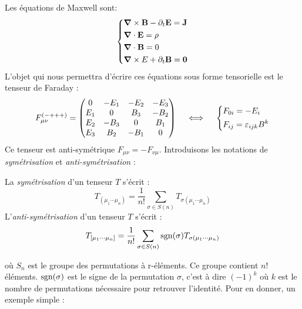 Les équations de Maxwell sont:
\begin{align}
    \begin{dcases}
        \bm{\mathrm{\nabla}} \times \bm{\mathrm{B}} -\partial_{t} \bm{\mathrm{E}} = \bm{\mathrm{J}}  \\
        \bm{\mathrm{\nabla}} \cdot \bm{\mathrm{E}} = \rho\\
        \bm{\mathrm{\nabla}} \cdot \bm{\mathrm{B}} = 0\\
        \bm{\mathrm{\nabla}} \times E + \partial_t \bm{\mathrm{B}} = \bm{\mathrm{0}}
    \end{dcases}
\end{align}
L'objet qui nous permettra d'écrire ces équations sous forme tensorielle est le tenseur de Faraday :
\begin{align}
    \label{eq: Faraday}
    F_{\mu \nu}^{(-+++)} =  \begin{pmatrix}
    0 & -E_1 & -E_2 & -E_3\\
    E_1 & 0 & B_3 & -B_2\\
    E_2 & -B_3 & 0 & B_1\\
    E_3 & B_2 & -B_1 & 0
    \end{pmatrix} \quad \iff \quad \begin{dcases}
        F_{0i} = -E_i\\
        F_{ij} =  \varepsilon_{ijk}B^k
    \end{dcases}
\end{align}
Ce tenseur est anti-symétrique $F_{\mu \nu} = - F_{\nu \mu}$. Introduisons les notations de \emph{symétrisation} et \emph{anti-symétrisation} :
\begin{theoremframe}
    \begin{defi}
        La \emph{symétrisation} d'un tenseur $T$ s'écrit :
        \begin{equation}
            T_{(\mu_{1} \cdots \mu_{n})} =\frac{1}{n!}\sum_{\sigma \in S(n)} T_{\sigma (\mu_{1} \cdots \mu_{n})}
        \end{equation}
        L'\emph{anti-symétrisation} d'un tenseur $T$ s'écrit :
        \begin{equation}
            T_{[\mu_{1} \cdots \mu_{n}]} =\frac{1}{n!}\sum_{\sigma \in S(n)} \operatorname{sgn} (\sigma) T_{\sigma (\mu_{1} \cdots \mu_{n})}
        \end{equation}
    \end{defi}
\end{theoremframe}
où $S_n$ est le groupe des permutations à r-éléments. Ce groupe contient $n!$ éléments. $\operatorname{sgn}(\sigma)$ est le signe de la permutation $\sigma$, c'est à dire $(-1)^k$ où $k$ est le nombre de permutations nécessaire pour retrouver l'identité. Pour en donner, un exemple simple :
